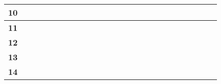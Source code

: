 \begin{center}
{\begin{tabular}{|c||c|c|c|c|c|c|c|c|c|c|c|c||c|c|c|c|c|c|c|c|c|c|c|c|}
  \textbf{\small{10}} &  &  &  &  &  &  &  &  &  &  &  &  &  & \cellcolor{black} &  &  &  &  &  &  &  &  &  & \\ \hline
  \textbf{\small{11}} &  &  &  &  &  &  &  &  &  &  &  &  &  & \cellcolor{black} &  &  &  &  &  &  &  &  &  & \\ \hline
  \textbf{\small{12}} &  &  &  &  &  &  &  &  &  &  &  &  &  &  & \cellcolor{black} &  &  &  &  &  &  &  &  & \\ \hline
  \textbf{\small{13}} &  &  &  &  &  &  &  &  &  &  &  &  &  &  &  & \cellcolor{black} &  &  &  &  &  &  &  & \\ \hline
  \textbf{\small{14}} &  &  &  &  &  &  &  &  &  &  &  & \cellcolor{black} & \cellcolor{black} & \cellcolor{black} & \cellcolor{black} & \cellcolor{black} & \cellcolor{black} & \cellcolor{black} &  &  &  &  &  & \\ \hline
\end{tabular}
}
\end{center}
